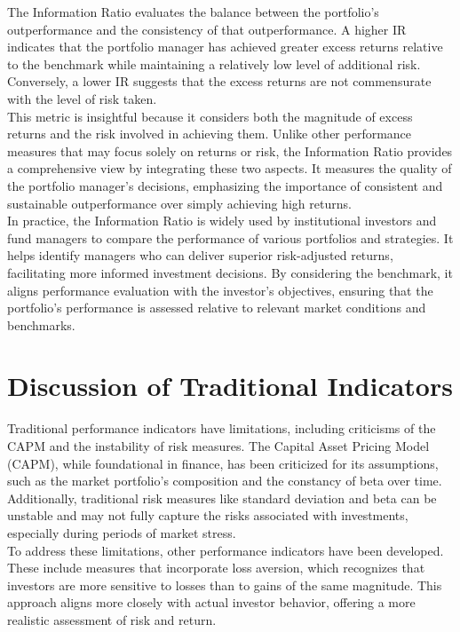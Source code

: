 \documentclass[a4paper,10pt]{article}
\begin{document}
\noindent The Information Ratio evaluates the balance between the portfolio's outperformance and the consistency of that outperformance. A higher IR indicates that the portfolio manager has achieved greater excess returns relative to the benchmark while maintaining a relatively low level of additional risk. Conversely, a lower IR suggests that the excess returns are not commensurate with the level of risk taken. \\

\noindent This metric is insightful because it considers both the magnitude of excess returns and the risk involved in achieving them. Unlike other performance measures that may focus solely on returns or risk, the Information Ratio provides a comprehensive view by integrating these two aspects. It measures the quality of the portfolio manager's decisions, emphasizing the importance of consistent and sustainable outperformance over simply achieving high returns. \\

\noindent In practice, the Information Ratio is widely used by institutional investors and fund managers to compare the performance of various portfolios and strategies. It helps identify managers who can deliver superior risk-adjusted returns, facilitating more informed investment decisions. By considering the benchmark, it aligns performance evaluation with the investor's objectives, ensuring that the portfolio's performance is assessed relative to relevant market conditions and benchmarks. \\

\section*{Discussion of Traditional Indicators}

\noindent Traditional performance indicators have limitations, including criticisms of the CAPM and the instability of risk measures. The Capital Asset Pricing Model (CAPM), while foundational in finance, has been criticized for its assumptions, such as the market portfolio's composition and the constancy of beta over time.\\

\noindent Additionally, traditional risk measures like standard deviation and beta can be unstable and may not fully capture the risks associated with investments, especially during periods of market stress. \\

\noindent To address these limitations, other performance indicators have been developed. These include measures that incorporate loss aversion, which recognizes that investors are more sensitive to losses than to gains of the same magnitude. This approach aligns more closely with actual investor behavior, offering a more realistic assessment of risk and return.\\
\end{document}
